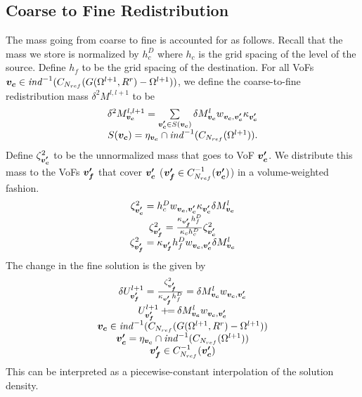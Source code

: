 \subsection{Coarse to Fine Redistribution}

The mass going from coarse to fine is accounted for as follows.
Recall that the mass we store is normalized by $h^D_c$ where
$h_c$ is the grid spacing of the level of the source.  Define 
$h_f$ to be the grid spacing of the destination.
For all VoFs 
${\boldsymbol{v_c}} \in {\it ind}^{-1}(C_{{{N}_{ref}}}(G(\Omega^{l+1}, R^r) - \Omega^{l+1}))$,
we define the coarse-to-fine redistribution mass $\delta^2 M^{l,l+1}$
to be 
\begin{equation}
\begin{array}{c}
\delta^2 M^{l,l+1}_{{\boldsymbol{v_c}}} = 
\sum\limits_{{\boldsymbol{v'_c}} \in S({\boldsymbol{v_c}})}  \delta M^l_{{\boldsymbol{v_c}}}
w_{{\boldsymbol{v_c}},{\boldsymbol{v'_c}}} \kappa_{\boldsymbol{v'_c}}
\\
S({\boldsymbol{v_c}}) = \eta_{{\boldsymbol{v_c}}} \cap {\it ind}^{-1}(C_{{{N}_{ref}}}(\Omega^{l+1})).
\end{array}
\label{eqn::ctofredist}
\end{equation}
Define $\zeta^2_{\boldsymbol{v'_c}}$ to be the unnormalized mass that goes
to VoF ${\boldsymbol{v'_c}}$.   We distribute this mass to the VoFs ${\boldsymbol{v'_f}}$ that
cover ${\boldsymbol{v'_c}}$ (${\boldsymbol{v'_f}} \in C^{-1}_{{N}_{ref}}({\boldsymbol{v'_c}})$) in a
volume-weighted fashion.
\begin{equation}
\begin{array}{c}
\zeta^2_{\boldsymbol{v'_c}} = h^D_c w_{{\boldsymbol{v_c}},{\boldsymbol{v'_c}}} \kappa_{\boldsymbol{v'_c}}
  \delta M^l_{{\boldsymbol{v_c}}} \\
\zeta^2_{\boldsymbol{v'_f}} = \frac{\kappa_{\boldsymbol{v'_f}} h^D_f}{\kappa_c h^D_c}\zeta^2_{\boldsymbol{v'_c}} \\
\zeta^2_{\boldsymbol{v'_f}} = \kappa_{\boldsymbol{v'_f}} h^D_f w_{{\boldsymbol{v_c}},{\boldsymbol{v'_c}}} 
\delta M^l_{{\boldsymbol{v_c}}} 
\end{array}
\end{equation}
The change in the fine solution is the given by
\begin{equation}
\begin{array}{c}
\delta U^{l+1}_{{\boldsymbol{v'_f}}}=\frac{\zeta^2_{\boldsymbol{v'_f}}}{\kappa_{\boldsymbol{v'_f}} h^D_f}
 = \delta M^l_{{\boldsymbol{v_c}}} w_{{\boldsymbol{v_c}},{\boldsymbol{v'_c}}} \\
U^{l+1}_{{\boldsymbol{v'_f}}} \mathbin{+\mkern-7mu=}  
\delta M^l_{{\boldsymbol{v_c}}} w_{{\boldsymbol{v_c}},{\boldsymbol{v'_c}}} \\
{\boldsymbol{v_c}} \in {\it ind}^{-1}(C_{{{N}_{ref}}}(G(\Omega^{l+1}, R^r) - \Omega^{l+1})) \\
{\boldsymbol{v'_c}} = \eta_{{\boldsymbol{v_c}}} \cap {\it ind}^{-1}(C_{{{N}_{ref}}}(\Omega^{l+1})) \\
{\boldsymbol{v'_f}} \in C^{-1}_{{N}_{ref}}({\boldsymbol{v'_c}}) 
\end{array}
\end{equation}
This can be interpreted as a piecewise-constant interpolation of the
solution density.

